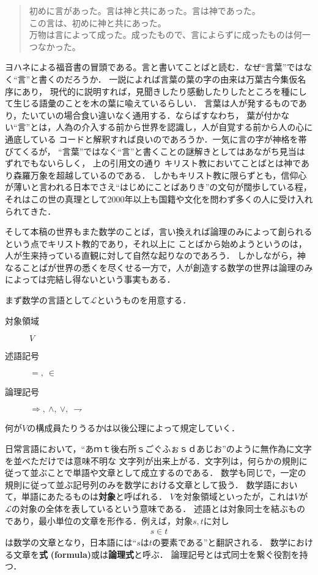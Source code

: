 	\begin{quote}
		初めに言があった。言は神と共にあった。言は神であった。\\
		この言は、初めに神と共にあった。\\
		万物は言によって成った。成ったもので、言によらずに成ったものは何一つなかった。
	\end{quote}
	ヨハネによる福音書の冒頭である。言と書いてことばと読む．なぜ``言葉''ではなく``言''と書くのだろうか．
	一説によれば言葉の葉の字の由来は万葉古今集仮名序にあり，
	現代的に説明すれば，見聞きしたり感動したりしたところを種にして生じる語彙のことを木の葉に喩えているらしい．
	言葉は人が発するものであり，たいていの場合食い違いなく通用する．ならばすなわち，
	葉が付かない``言''とは，人為の介入する前から世界を認識し，人が自覚する前から人の心に通底している
	コードと解釈すれば良いのであろうか．一気に言の字が神格を帯びてくるが，
	``言葉''ではなく``言''と書くことの謎解きとしてはあながち見当はずれでもないらしく，
	上の引用文の通り%
	キリスト教においてことばとは神であり森羅万象を超越しているのである．
	しかもキリスト教に限らずとも，信仰心が薄いと言われる日本でさえ``はじめにことばありき''の文句が闊歩している程，
	それはこの世の真理として2000年以上も国籍や文化を問わず多くの人に受け入れられてきた．
	\begin{comment}
		実際に自然言語の発生が事物の観測なしに起こり得たかという問題は言語哲学上も決着がついていないらしいが，
		少なくとも
	\end{comment}
	そして本稿の世界もまた数学のことば，言い換えれば論理のみによって創られるという点でキリスト教的であり，それ以上に
	ことばから始めようというのは，人が生来持っている直観に対して自然な起りなのであろう．
	しかしながら，神なることばが世界の悉くを尽くせる一方で，人が創造する数学の世界は論理のみによっては完結し得ないという事実もある．
	
	まず数学の言語として$\mathcal{L}$というものを用意する．
	\begin{description}
		\item[対象領域] $V$
		\item[述語記号] $=,\ \in$
		\item[論理記号] $\Longrightarrow,\ \wedge,\ \vee,\ \rightharpoondown$
	\end{description}
	何が$V$の構成員たりうるかは以後公理によって規定していく．
	
	日常言語において，``あｍｔ後右所ｓごぐふぉｓｄあじお''のように無作為に文字を並べただけでは意味不明な
	文字列が出来上がる．文字列は，何らかの規則に従って並ぶことで単語や文章として成立するのである．
	数学も同じで，一定の規則に従って並ぶ記号列のみを数学における文章として扱う．
	数学語において，単語にあたるものは{\bf 対象}と呼ばれる．
	$V$を対象領域といったが，これは$V$が$\mathcal{L}$の対象の全体を表しているという意味である．
	述語とは対象同士を結ぶものであり，最小単位の文章を形作る．例えば，対象$s,t$に対し
	\begin{align}
		s \in t
	\end{align}
	は数学の文章となり，日本語には``$s$は$t$の要素である''と翻訳される．
	数学における文章を{\bf 式}
	{\bf (formula)}或は{\bf 論理式}と呼ぶ．
	論理記号とは式同士を繋ぐ役割を持つ．
	
